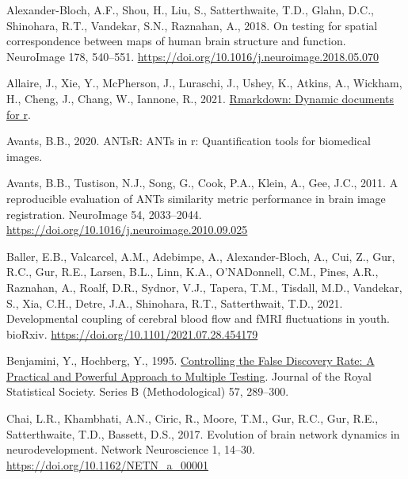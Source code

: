 \documentclass[
  12pt,
]{article}
\newlength{\cslhangindent}
\newlength{\cslentryspacingunit} %
\newenvironment{CSLReferences}[2] %
 {%
  \setlength{\parindent}{0pt}
  \ifodd #1
  \let\oldpar\par
  \def\par{\hangindent=\cslhangindent\oldpar}
  \fi
  \setlength{\parskip}{#2\cslentryspacingunit}
 }%
 {}
\begin{document}
\hypertarget{refs}{}
\begin{CSLReferences}{1}{0}
\leavevmode{}%
Alexander-Bloch, A.F., Shou, H., Liu, S., Satterthwaite, T.D., Glahn, D.C., Shinohara, R.T., Vandekar, S.N., Raznahan, A., 2018. On testing for spatial correspondence between maps of human brain structure and function. NeuroImage 178, 540--551. \url{https://doi.org/10.1016/j.neuroimage.2018.05.070}

\leavevmode{}%
Allaire, J., Xie, Y., McPherson, J., Luraschi, J., Ushey, K., Atkins, A., Wickham, H., Cheng, J., Chang, W., Iannone, R., 2021. \href{https://CRAN.R-project.org/package=rmarkdown}{Rmarkdown: Dynamic documents for r}.

\leavevmode{}%
Avants, B.B., 2020. ANTsR: ANTs in r: Quantification tools for biomedical images.

\leavevmode{}%
Avants, B.B., Tustison, N.J., Song, G., Cook, P.A., Klein, A., Gee, J.C., 2011. A reproducible evaluation of {ANTs} similarity metric performance in brain image registration. NeuroImage 54, 2033--2044. \url{https://doi.org/10.1016/j.neuroimage.2010.09.025}

\leavevmode{}%
Baller, E.B., Valcarcel, A.M., Adebimpe, A., Alexander-Bloch, A., Cui, Z., Gur, R.C., Gur, R.E., Larsen, B.L., Linn, K.A., O'NADonnell, C.M., Pines, A.R., Raznahan, A., Roalf, D.R., Sydnor, V.J., Tapera, T.M., Tisdall, M.D., Vandekar, S., Xia, C.H., Detre, J.A., Shinohara, R.T., Satterthwait, T.D., 2021. Developmental coupling of cerebral blood flow and {fMRI} fluctuations in youth. bioRxiv. \url{https://doi.org/10.1101/2021.07.28.454179}

\leavevmode{}%
Benjamini, Y., Hochberg, Y., 1995. \href{https://www.jstor.org/stable/2346101}{Controlling the {False Discovery Rate}: {A Practical} and {Powerful Approach} to {Multiple Testing}}. Journal of the Royal Statistical Society. Series B (Methodological) 57, 289--300.

\leavevmode{}%
Chai, L.R., Khambhati, A.N., Ciric, R., Moore, T.M., Gur, R.C., Gur, R.E., Satterthwaite, T.D., Bassett, D.S., 2017. Evolution of brain network dynamics in neurodevelopment. Network Neuroscience 1, 14--30. \url{https://doi.org/10.1162/NETN_a_00001}


\end{CSLReferences}
\end{document}
